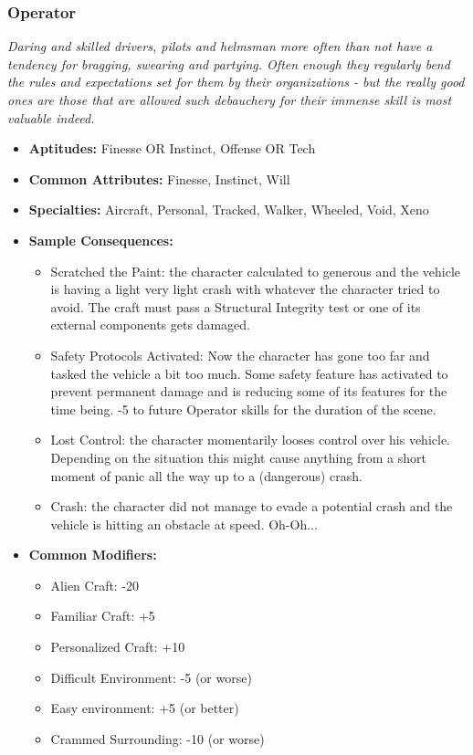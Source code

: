  \subsubsection{Operator}\label{Operator}
 \textit{Daring and skilled drivers, pilots and helmsman more often than not have a tendency for bragging, swearing and partying.
 Often enough they regularly bend the rules and expectations set for them by their organizations - but the really good ones are those that are allowed such debauchery for their immense skill is most valuable indeed.}
 \begin{itemize}
 	\item \textbf{Aptitudes:} Finesse OR Instinct, Offense OR Tech
 	\item \textbf{Common Attributes:} Finesse, Instinct, Will
 	\item \textbf{Specialties:} Aircraft, Personal, Tracked, Walker, Wheeled, Void, Xeno
 	\item \textbf{Sample Consequences:} 
 	\begin{itemize}
 		\item Scratched the Paint: the character calculated to generous and the vehicle is having a light very light crash with whatever the character tried to avoid. The craft must pass a Structural Integrity test or one of its external components gets damaged.
 		\item Safety Protocols Activated: Now the character has gone too far and tasked the vehicle a bit too much. Some safety feature has activated to prevent permanent damage and is reducing some of its features for the time being. -5 to future Operator skills for the duration of the scene.
 		\item Lost Control: the character momentarily looses control over his vehicle. Depending on the situation this might cause anything from a short moment of panic all the way up to a (dangerous) crash.
 		\item Crash: the character did not manage to evade a potential crash and the vehicle is hitting an obstacle at speed. Oh-Oh...
 	\end{itemize}
 	\item \textbf{Common Modifiers:}
 	\begin{itemize}
 		\item Alien Craft: -20
 		\item Familiar Craft: +5
 		\item Personalized Craft: +10
 		\item Difficult Environment: -5 (or worse)
 		\item Easy environment: +5 (or better)
 		\item Crammed Surrounding: -10 (or worse)
 	\end{itemize}
 \end{itemize}

